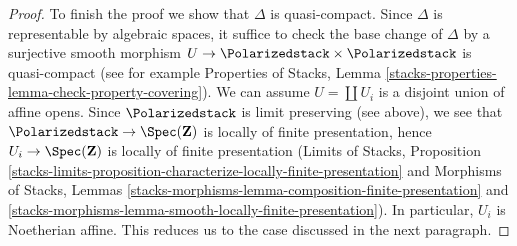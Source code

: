 \begin{proof}
\medskip\noindent
To finish the proof we show that $\Delta$ is quasi-compact. Since
$\Delta$ is representable by algebraic spaces, it suffice to check
the base change of $\Delta$ by a surjective smooth morphism
$U \to \Polarizedstack \times \Polarizedstack$ is quasi-compact
(see for example Properties of Stacks, Lemma
\ref{stacks-properties-lemma-check-property-covering}).
We can assume $U = \coprod U_i$ is a disjoint union of affine opens.
Since $\Polarizedstack$ is limit preserving (see above), we
see that $\Polarizedstack \to \Spec(\mathbf{Z})$ is locally of
finite presentation, hence $U_i \to \Spec(\mathbf{Z})$ is
locally of finite presentation
(Limits of Stacks, Proposition
\ref{stacks-limits-proposition-characterize-locally-finite-presentation}
and Morphisms of Stacks, Lemmas
\ref{stacks-morphisms-lemma-composition-finite-presentation} and
\ref{stacks-morphisms-lemma-smooth-locally-finite-presentation}).
In particular, $U_i$ is Noetherian affine. This reduces us to the
case discussed in the next paragraph.


\end{proof}
